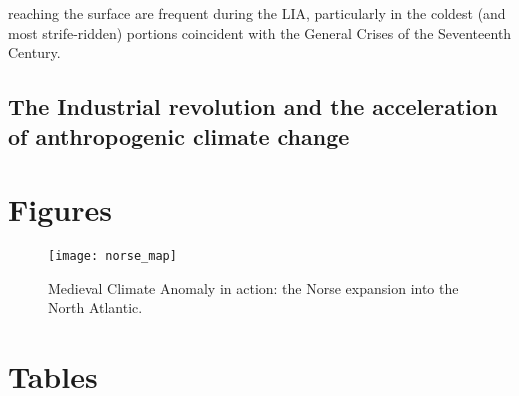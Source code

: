 \documentclass[amstex,12pt]{book}
\begin{document}
reaching the surface are frequent during the LIA, particularly in the coldest (and most strife-ridden) portions coincident with the General Crises of the Seventeenth Century. \\

   
\subsection{The Industrial revolution and the acceleration of anthropogenic climate change}

\clearpage 
\section{Figures}

\begin{figure}
\begin{center}
	\texttt{[image: norse\_map]}%
	\caption{Medieval Climate Anomaly in action: the Norse expansion into the North Atlantic.}
	\label{fig:norse_map}
\end{center}
\end{figure}

\clearpage 
\section{Tables}
\end{document}
